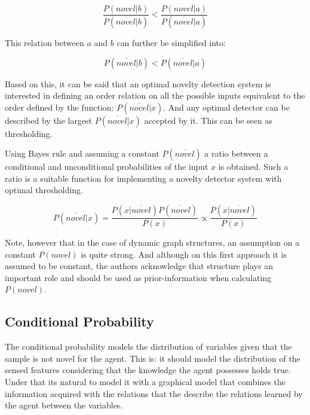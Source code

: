 \documentclass[runningheads,a4paper]{llncs}
\begin{document}
\begin{equation}
\label{eq:knapsack}
\frac{P(novel|b)}{P(\overline{novel}|b)} < \frac{P(novel|a)}{P(\overline{novel}|a)}
\end{equation}

This relation between $a$ and $b$ can further be simplified into:

\begin{equation}
P(\overline{novel}|b) < P(\overline{novel}|a)
\end{equation}


Based on this, it can be said that an optimal novelty detection system is
interested in defining an order relation on all the possible inputs equivalent
to the order defined by the function: $P(\overline{novel}|x)$.
And any optimal detector can be described by the largest $P(\overline{novel}|x)$
accepted by it. This can be seen as thresholding.

Using Bayes rule and assuming a constant $P(\overline{novel})$
a ratio between a conditional and unconditional probabilities of the input $x$ is obtained.
Such a ratio is a suitable function for implementing a novelty detector system with optimal
thresholding.

\begin{equation}
\label{eq:novelty-threshold}
          P(\overline{novel}|x)
  =       \frac{P(x|\overline{novel}) P(\overline{novel})}{P(x)}
  \propto \frac{P(x|\overline{novel})}{P(x)}
\end{equation}

Note, however that in the case of dynamic graph structures, an assumption on a constant
$P(novel)$ is quite strong. And although on this first approach it is assumed to be
constant, the authors acknowledge that structure plays an important role and should
be used as prior-information when calculating $P(novel)$.

\subsection{Conditional Probability}
\label{sec:conditional-prob}
The conditional probability models the distribution of variables given that the sample
is not novel for the agent.
This is: it should model the distribution of the sensed features considering that the
knowledge the agent possesses holds true. Under that its natural to model it with a graphical
model that combines the information acquired with the relations that the describe the
relations learned by the agent between the variables.
\end{document}
